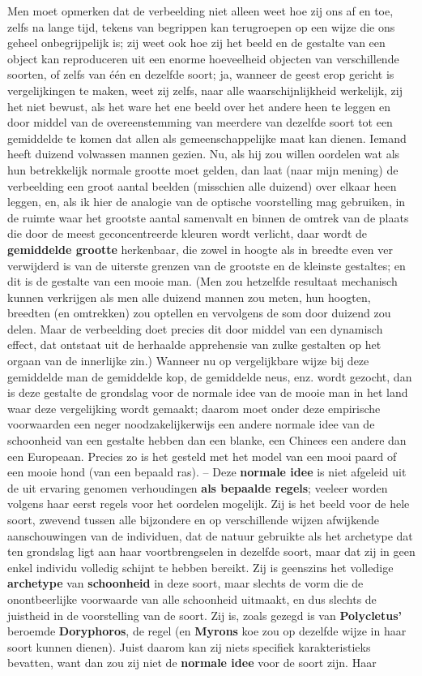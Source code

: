 Men moet opmerken dat de verbeelding niet alleen weet hoe zij ons af en toe, zelfs na lange tijd, tekens van begrippen kan terugroepen op een wijze die ons geheel onbegrijpelijk is; zij weet ook hoe zij het beeld en de gestalte van een object kan reproduceren uit een enorme hoeveelheid objecten van verschillende soorten, of zelfs van één en dezelfde soort; ja, wanneer de geest erop gericht is vergelijkingen te maken, weet zij zelfs, naar alle waarschijnlijkheid werkelijk, zij het niet bewust, als het ware het ene beeld over het andere heen te leggen en door middel van de overeenstemming van meerdere van dezelfde soort tot een gemiddelde te komen dat allen als gemeenschappelijke maat kan dienen. Iemand heeft duizend volwassen mannen gezien. Nu, als hij zou willen oordelen wat als hun betrekkelijk normale grootte moet gelden, dan laat (naar mijn mening) de verbeelding een groot aantal beelden (misschien alle duizend) over elkaar heen leggen, en, als ik hier de analogie van de optische voorstelling mag gebruiken, in de ruimte waar het grootste aantal samenvalt en binnen de omtrek van de plaats die door de meest geconcentreerde kleuren wordt verlicht, daar wordt de \textbf{gemiddelde grootte} herkenbaar, die zowel in hoogte als in breedte even ver verwijderd is van de uiterste grenzen van de grootste en de kleinste gestaltes; en dit is de gestalte van een mooie man. (Men zou hetzelfde resultaat mechanisch kunnen verkrijgen als men alle duizend mannen zou meten, hun hoogten, breedten (en omtrekken) zou optellen en vervolgens de som door duizend zou delen. Maar de verbeelding doet precies dit door middel van een dynamisch effect, dat ontstaat uit de herhaalde apprehensie van zulke gestalten op het orgaan van de innerlijke zin.) Wanneer nu op vergelijkbare wijze bij deze gemiddelde man de gemiddelde kop, de gemiddelde neus, enz. wordt gezocht, dan is deze gestalte de grondslag voor de normale idee van de mooie man in het land waar deze vergelijking wordt gemaakt; daarom moet onder deze empirische voorwaarden een neger noodzakelijkerwijs een andere normale idee van de schoonheid van een gestalte hebben dan een blanke, een Chinees een andere dan een Europeaan. Precies zo is het gesteld met het model van een mooi paard of een mooie hond (van een bepaald ras). – Deze \textbf{normale idee} is niet afgeleid uit de uit ervaring genomen verhoudingen \textbf{als bepaalde regels}; veeleer worden volgens haar eerst regels voor het oordelen mogelijk. Zij is het beeld voor de hele soort, zwevend tussen alle bijzondere en op verschillende wijzen afwijkende aanschouwingen van de individuen, dat de natuur gebruikte als het archetype dat ten grondslag ligt aan haar voortbrengselen in dezelfde soort, maar dat zij in geen enkel individu volledig schijnt te hebben bereikt. Zij is geenszins het volledige \textbf{archetype} van \textbf{schoonheid} in deze soort, maar slechts de vorm die de onontbeerlijke voorwaarde van alle schoonheid uitmaakt, en dus slechts de juistheid in de voorstelling van de soort. Zij is, zoals gezegd is van \textbf{Polycletus’} beroemde \textbf{Doryphoros}, de regel (en \textbf{Myrons} koe zou op dezelfde wijze in haar soort kunnen dienen). Juist daarom kan zij niets specifiek karakteristieks bevatten, want dan zou zij niet de \textbf{normale idee} voor de soort zijn. Haar 